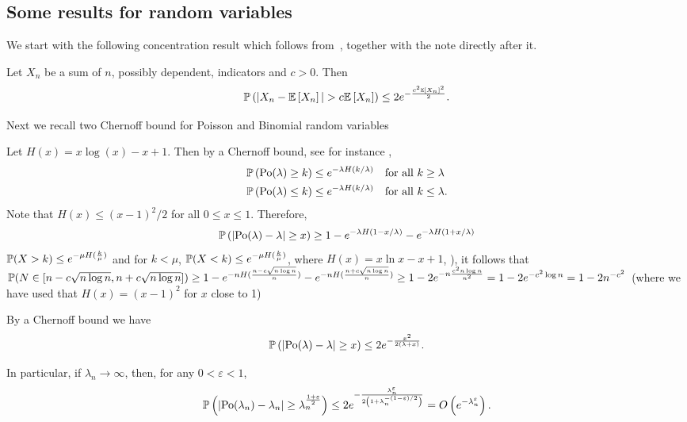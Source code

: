 \begin{appendices}
\section{Some results for random variables}

We start with the following concentration result which follows from~\cite[Theorem 4]{freedman1973another}, together with the note directly after it.

\begin{lemma}\label{lem:general_concentration_sum_indicators}
Let $X_n$ be a sum of $n$, possibly dependent, indicators and $c > 0$. Then
\[
	\mathbb{P}\left(|X_n - \mathbb{E}\left[X_n\right]| > c \mathbb{E}\left[X_n\right]\right) \le 2 e^{-\frac{c^2 \mathbb{E}\left[X_n\right]^2}{2}}.
\]
\end{lemma}

Next we recall two Chernoff bound for Poisson and Binomial random variables

Let $H(x) = x\log(x) - x + 1$. Then by a Chernoff bound, see for instance \cite[Lemma 1.2]{penrose2003random},
\begin{align*}
	&\mathbb{P}\left({\mathrm{Po}}(\lambda) \ge k\right) \le e^{-\lambda H(k/\lambda)} \quad \text{for all } k \ge \lambda\\
	&\mathbb{P}\left({\mathrm{Po}}(\lambda) \le k\right) \le e^{-\lambda H(k/\lambda)} \quad \text{for all } k \le \lambda.
\end{align*}
Note that $H(x) \le (x-1)^2/2$ for all $0 \le x \le 1$. Therefore, 
\begin{align*}
	\mathbb{P}\left(\left|\mathrm{Po}(\lambda) - \lambda\right| \ge x\right) \ge 1 - e^{-\lambda H(1 - x/\lambda)} - e^{-\lambda H(1 + x/\lambda)}
\end{align*}
 $\mathbb{P}(X >k) \leq e^{-\mu H(\frac{k}{\mu})}$ and for $k<\mu$, $\mathbb{P}(X< k) \leq e^{-\mu H(\frac{k}{\mu})}$, where $H(x) = x\ln x -x+1$, \cite{penrose2003random}), it follows that $\mathbb{P}(N \in [n-c\sqrt{n\log n},n+c\sqrt{n\log n}]) \geq 1-e^{-n H(\frac{n-c\sqrt{n\log n}}{n})}-e^{-nH(\frac{n+c\sqrt{n \log n}}{n})} \geq  1-2e^{-n \frac{c^2 n \log n}{n^2}} = 1-2e^{-c^2\log n}=1-2n^{-c^2}$ (where we have used that $H(x) = (x-1)^2$ for $x$ close to 1)

By a Chernoff bound we have
\begin{equation}\label{eq:def_chernoff_bound_poisson}
	\mathbb{P}\left(\left|\mathrm{Po}(\lambda) - \lambda\right| \ge x\right) \le 2e^{-\frac{x^2}{2(\lambda + x)}}.
\end{equation}

In particular, if $\lambda_n \to \infty$, then, for any $0 < \varepsilon < 1$,
\[
	\mathbb{P}\left(\left|\mathrm{Po}(\lambda_n) - \lambda_n\right| \ge \lambda_n^{\frac{1+\varepsilon}{2}}\right) \le 2e^{-\frac{\lambda_n^\varepsilon}{2\left(1 + \lambda_n^{-(1 - \varepsilon)/2}\right)}}
	= O\left(e^{-\lambda_n^\varepsilon}\right).
\]


\end{appendices}

